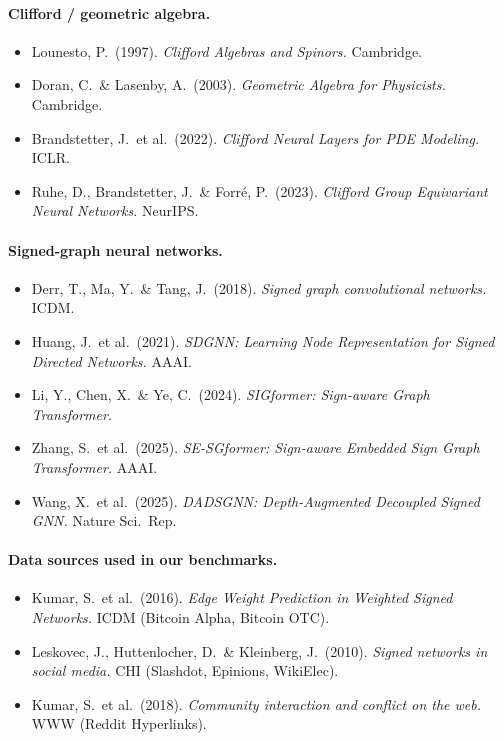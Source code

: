 \documentclass[11pt,a4paper]{article}
\theoremstyle{remark}
\begin{document}
\paragraph{Clifford / geometric algebra.}
\begin{itemize}
\item Lounesto, P.\ (1997). \emph{Clifford Algebras and Spinors.} Cambridge.
\item Doran, C.\ \& Lasenby, A.\ (2003). \emph{Geometric Algebra for Physicists.} Cambridge.
\item Brandstetter, J.\ et al.\ (2022). \emph{Clifford Neural Layers for PDE Modeling.} ICLR.
\item Ruhe, D., Brandstetter, J.\ \& Forré, P.\ (2023). \emph{Clifford Group Equivariant Neural Networks.} NeurIPS.
\end{itemize}

\paragraph{Signed-graph neural networks.}
\begin{itemize}
\item Derr, T., Ma, Y.\ \& Tang, J.\ (2018). \emph{Signed graph convolutional networks.} ICDM.
\item Huang, J.\ et al.\ (2021). \emph{SDGNN: Learning Node Representation for Signed Directed Networks.} AAAI.
\item Li, Y., Chen, X.\ \& Ye, C.\ (2024). \emph{SIGformer: Sign-aware Graph Transformer.}
\item Zhang, S.\ et al.\ (2025). \emph{SE-SGformer: Sign-aware Embedded Sign Graph Transformer.} AAAI.
\item Wang, X.\ et al.\ (2025). \emph{DADSGNN: Depth-Augmented Decoupled Signed GNN.} Nature Sci.\ Rep.
\end{itemize}

\paragraph{Data sources used in our benchmarks.}
\begin{itemize}
\item Kumar, S.\ et al.\ (2016). \emph{Edge Weight Prediction in Weighted Signed Networks.} ICDM (Bitcoin Alpha, Bitcoin OTC).
\item Leskovec, J., Huttenlocher, D.\ \& Kleinberg, J.\ (2010). \emph{Signed networks in social media.} CHI (Slashdot, Epinions, WikiElec).
\item Kumar, S.\ et al.\ (2018). \emph{Community interaction and conflict on the web.} WWW (Reddit Hyperlinks).
\end{itemize}
\end{document}
